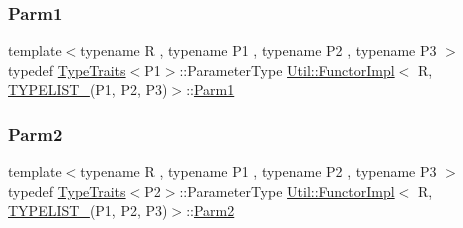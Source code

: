 \subsubsection{\texorpdfstring{Parm1}{Parm1}\hspace{0.1cm}{\footnotesize\ttfamily [3/3]}}
{\footnotesize\ttfamily template$<$typename R , typename P1 , typename P2 , typename P3 $>$ \\
typedef \mbox{\hyperlink{classUtil_1_1TypeTraits}{Type\+Traits}}$<$P1$>$\+::Parameter\+Type \mbox{\hyperlink{classUtil_1_1FunctorImpl}{Util\+::\+Functor\+Impl}}$<$ R, \mbox{\hyperlink{adat__devel__install_2include_2adat_2typelist_8h_a0309f68a543c5c0994f9edc0e56dc59f}{T\+Y\+P\+E\+L\+I\+S\+T\+\_}}(P1, P2, P3)$>$\+::\mbox{\hyperlink{structUtil_1_1Private_1_1FunctorImplBase_a9d61e693d6c616dea5bd9d9073c7d21a}{Parm1}}}

\mbox{\label{classUtil_1_1FunctorImpl_3_01R_00_01TYPELIST__3_07P1_00_01P2_00_01P3_08_4_a0f99a7ea311c3cc8934098ce9fe769c1}} 
\subsubsection{\texorpdfstring{Parm2}{Parm2}\hspace{0.1cm}{\footnotesize\ttfamily [1/3]}}
{\footnotesize\ttfamily template$<$typename R , typename P1 , typename P2 , typename P3 $>$ \\
typedef \mbox{\hyperlink{classUtil_1_1TypeTraits}{Type\+Traits}}$<$P2$>$\+::Parameter\+Type \mbox{\hyperlink{classUtil_1_1FunctorImpl}{Util\+::\+Functor\+Impl}}$<$ R, \mbox{\hyperlink{adat__devel__install_2include_2adat_2typelist_8h_a0309f68a543c5c0994f9edc0e56dc59f}{T\+Y\+P\+E\+L\+I\+S\+T\+\_}}(P1, P2, P3)$>$\+::\mbox{\hyperlink{structUtil_1_1Private_1_1FunctorImplBase_a554085cd798ef14838a59b528f0feb2e}{Parm2}}}

\mbox{\label{classUtil_1_1FunctorImpl_3_01R_00_01TYPELIST__3_07P1_00_01P2_00_01P3_08_4_a0f99a7ea311c3cc8934098ce9fe769c1}} 
